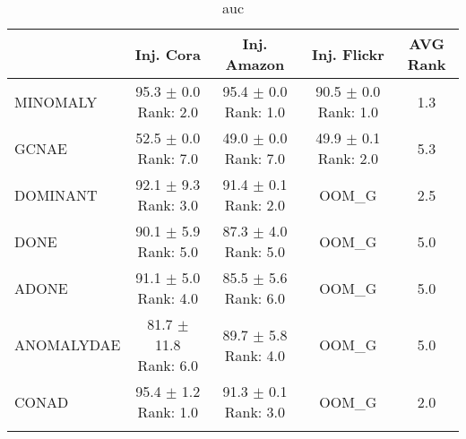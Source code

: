 \begin{longtable}{|l|c|c|c|c|}
\hline
 & Inj. Cora & Inj. Amazon & Inj. Flickr & AVG Rank \\ \hline
MINOMALY & \makecell{ 95.3 $\pm$ 0.0 \\ \tiny Rank: 2.0 } & \makecell{ 95.4 $\pm$ 0.0 \\ \tiny Rank: 1.0 } & \makecell{ 90.5 $\pm$ 0.0 \\ \tiny Rank: 1.0 } & 1.3 \\ \hline 
GCNAE & \makecell{ 52.5 $\pm$ 0.0 \\ \tiny Rank: 7.0 } & \makecell{ 49.0 $\pm$ 0.0 \\ \tiny Rank: 7.0 } & \makecell{ 49.9 $\pm$ 0.1 \\ \tiny Rank: 2.0 } & 5.3 \\ \hline 
DOMINANT & \makecell{ 92.1 $\pm$ 9.3 \\ \tiny Rank: 3.0 } & \makecell{ 91.4 $\pm$ 0.1 \\ \tiny Rank: 2.0 } & OOM\_G & 2.5 \\ \hline 
DONE & \makecell{ 90.1 $\pm$ 5.9 \\ \tiny Rank: 5.0 } & \makecell{ 87.3 $\pm$ 4.0 \\ \tiny Rank: 5.0 } & OOM\_G & 5.0 \\ \hline 
ADONE & \makecell{ 91.1 $\pm$ 5.0 \\ \tiny Rank: 4.0 } & \makecell{ 85.5 $\pm$ 5.6 \\ \tiny Rank: 6.0 } & OOM\_G & 5.0 \\ \hline 
ANOMALYDAE & \makecell{ 81.7 $\pm$ 11.8 \\ \tiny Rank: 6.0 } & \makecell{ 89.7 $\pm$ 5.8 \\ \tiny Rank: 4.0 } & OOM\_G & 5.0 \\ \hline 
CONAD & \makecell{ 95.4 $\pm$ 1.2 \\ \tiny Rank: 1.0 } & \makecell{ 91.3 $\pm$ 0.1 \\ \tiny Rank: 3.0 } & OOM\_G & 2.0 \\ \hline 
\caption{ auc } \label{tab:auc}
\end{longtable}
